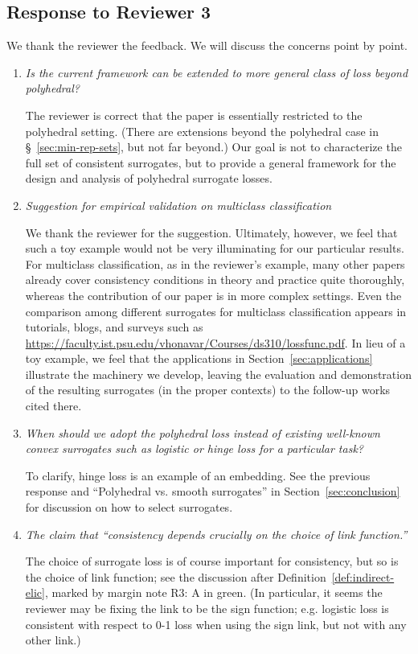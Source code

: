 \documentclass[a4paper]{article}
\begin{document}
\subsection*{Response to Reviewer 3}

We thank the reviewer the feedback. We will discuss the concerns point by point.

\begin{enumerate}
	\item \emph{Is the current framework can be extended to more general class of loss beyond polyhedral?}
	
	The reviewer is correct that the paper is essentially restricted to the polyhedral setting.  (There are extensions beyond the polyhedral case in \S~\ref{sec:min-rep-sets}, but not far beyond.)  Our goal is not to characterize the full set of consistent surrogates, but to provide a general framework for the design and analysis of polyhedral surrogate losses.
	
	\item \emph{Suggestion for empirical validation on multiclass classification}
	
	We thank the reviewer for the suggestion.  Ultimately, however, we feel that such a toy example would not be very illuminating for our particular results.  For multiclass classification, as in the reviewer’s example, many other papers already cover consistency conditions in theory and practice quite thoroughly, whereas the contribution of our paper is in more complex settings.  Even the comparison among different surrogates for multiclass classification appears in tutorials, blogs, and surveys such as \url{https://faculty.ist.psu.edu/vhonavar/Courses/ds310/lossfunc.pdf}.
	In lieu of a toy example, we feel that the applications in Section~\ref{sec:applications} illustrate the machinery we develop, leaving the evaluation and demonstration of the resulting surrogates (in the proper contexts) to the follow-up works cited there.
	
	\item \emph{When should we adopt the polyhedral loss instead of existing well-known convex surrogates such as logistic or hinge loss for a particular task?}
	
	To clarify, hinge loss is an example of an embedding.  See the previous response and “Polyhedral vs. smooth surrogates” in Section~\ref{sec:conclusion} for discussion on how to select surrogates.
	
	\item \emph{The claim that ``consistency depends crucially on the choice of link function.''}

	The choice of surrogate loss is of course important for consistency, but so is the choice of link function; see the discussion after Definition~\ref{def:indirect-elic}, marked by margin note R3: A in green.  
	(In particular, it seems the reviewer may be fixing the link to be the sign function; e.g. logistic loss is consistent with respect to 0-1 loss when using the sign link, but not with any other link.)	
	
\end{enumerate}
\end{document}
